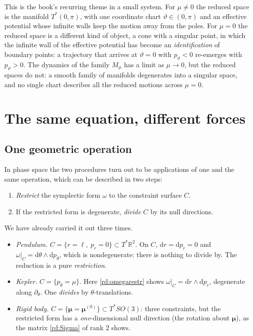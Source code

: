 This is the book's recurring theme in a small system. For $\mu\ne0$ the reduced space is the manifold $T^*(0,\pi)$, with one coordinate chart $\vartheta\in(0,\pi)$ and an effective potential whose infinite walls keep the motion away from the poles. For $\mu=0$ the reduced space is a different kind of object, a cone with a singular point, in which the infinite wall of the effective potential has become an \emph{identification} of boundary points: a trajectory that arrives at $\vartheta=0$ with $p_\vartheta<0$ re-emerges with $p_\vartheta>0$. The dynamics of the family $M_\mu$ has a limit as $\mu\to0$, but the reduced spaces do not: a smooth family of manifolds degenerates into a singular space, and no single chart describes all the reduced motions across $\mu=0$.

\section{The same equation, different forces}\label{rd:sec:unified}

\subsection{One geometric operation}\label{rd:sec:oneop}

In phase space the two procedures turn out to be applications of one and the same operation, which can be described in two steps:
\begin{enumerate}
\item \emph{Restrict} the symplectic form $\omega$ to the constraint surface $C$.
\item If the restricted form is degenerate, \emph{divide} $C$ by its null directions.
\end{enumerate}
We have already carried it out three times.

\begin{itemize}
\item \emph{Pendulum.} $C=\{r=\ell,\ p_r=0\}\subset T^*\mathbb R^2$. On $C$, $\mathrm dr=\mathrm dp_r=0$ and $\omega|_C=\mathrm d\theta\wedge\mathrm dp_\theta$, which is nondegenerate: there is nothing to divide by. The reduction is a pure \emph{restriction}.
\item \emph{Kepler.} $C=\{p_\theta=\mu\}$. Here \eqref{rd:omegarestr} shows $\omega|_C=\mathrm dr\wedge\mathrm dp_r$, degenerate along $\partial_\theta$. One \emph{divides} by $\theta$-translations.
\item \emph{Rigid body.} $C=\{\boldsymbol\mu=\boldsymbol\mu^{(0)}\}\subset T^*SO(3)$: three constraints, but the restricted form has a \emph{one}-dimensional null direction (the rotation about $\boldsymbol\mu$), as the matrix \eqref{rd:Sigma} of rank $2$ shows.
\end{itemize}

